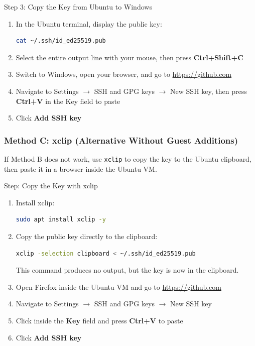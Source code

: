 \documentclass[
    a4paper,
    11pt,
    parskip=half
]{scrartcl}
\begin{document}
\begin{stepbox}{Step 3: Copy the Key from Ubuntu to Windows}
\begin{enumerate}
    \item In the Ubuntu terminal, display the public key:
\begin{lstlisting}[language=bash]
cat ~/.ssh/id_ed25519.pub
\end{lstlisting}

    \item Select the entire output line with your mouse, then press \textbf{Ctrl+Shift+C}

    \item Switch to Windows, open your browser, and go to \url{https://github.com}

    \item Navigate to Settings $\to$ SSH and GPG keys $\to$ New SSH key, then press \textbf{Ctrl+V} in the Key field to paste

    \item Click \textbf{Add SSH key}
\end{enumerate}
\end{stepbox}

\subsubsection*{Method C: xclip (Alternative Without Guest Additions)}

If Method B does not work, use \texttt{xclip} to copy the key to the Ubuntu clipboard, then paste it in a browser inside the Ubuntu VM.

\begin{stepbox}{Step: Copy the Key with xclip}
\begin{enumerate}
    \item Install xclip:
\begin{lstlisting}[language=bash]
sudo apt install xclip -y
\end{lstlisting}

    \item Copy the public key directly to the clipboard:
\begin{lstlisting}[language=bash]
xclip -selection clipboard < ~/.ssh/id_ed25519.pub
\end{lstlisting}
    This command produces no output, but the key is now in the clipboard.

    \item Open Firefox inside the Ubuntu VM and go to \url{https://github.com}

    \item Navigate to Settings $\to$ SSH and GPG keys $\to$ New SSH key

    \item Click inside the \textbf{Key} field and press \textbf{Ctrl+V} to paste

    \item Click \textbf{Add SSH key}
\end{enumerate}
\end{stepbox}
\end{document}
